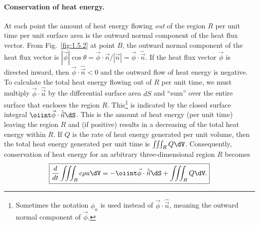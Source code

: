 \paragraph{Conservation of heat energy.}
At each point the amount of heat energy flowing \emph{out} of the region $R$ per unit time per unit surface area is the outward normal component of the heat flux vector. From Fig.~\ref{fig:1.5.2} at point $B$, the outward normal component of the heat flux vector is $|\vec{\phi}|\cos\theta = \vec{\phi}\cdot\vec{n}/|\vec{n}| = \vec{\phi}\cdot\hat{\vec{n}}$. If the heat flux vector $\vec{\phi}$ is directed inward, then $\vec{\phi}\cdot\hat{\vec{n}} < 0$ and the outward flow of heat energy is negative. To calculate the total heat energy flowing out of $R$ per unit time, we must multiply $\vec{\phi}\cdot\hat{\vec{n}}$ by the differential surface area $dS$ and ``sum'' over the entire surface that encloses the region $R$. This\footnote{Sometimes the notation $\phi_n$ is used instead of $\vec{\phi}\cdot\hat{\vec{n}}$, meaning the outward normal component of $\vec{\phi}$.} is indicated by the closed surface integral $\oiint \vec{\phi}\cdot\hat{\vec{n}}\dS$. This is the amount of heat energy (per unit time) leaving the region $R$ and (if positive) results in a decreasing of the total heat energy within $R$. If $Q$ is the rate of heat energy generated per unit volume, then the total heat energy generated per unit time is $\iiint_R Q\dV$. Consequently, conservation of heat energy for an arbitrary three-dimensional region $R$ becomes
\begin{equation}
\boxed{\frac{d}{d t}\iiint_R c\rho u\dV = -\oiint \vec{\phi}\cdot\hat{\vec{n}}\dS + \iiint_R Q\dV.}
\label{eq:1.5.1}
\end{equation}

